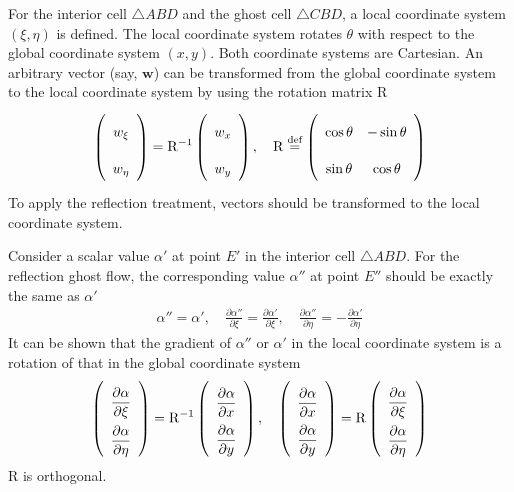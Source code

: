 \documentclass[a4paper,12pt,dvips]{article}
\newcommand*\defeq{\buildrel{\text{def}}\over{=}}
\begin{document}
For the interior cell $\bigtriangleup ABD$ and the ghost cell $\bigtriangleup
CBD$, a local coordinate system $(\xi, \eta)$ is defined.  The local coordinate
system rotates $\theta$ with respect to the global coordinate system $(x, y)$.
Both coordinate systems are Cartesian.  An arbitrary vector (say, $\mathbf{w}$)
can be transformed from the global coordinate system to the local coordinate
system by using the rotation matrix $\mathrm{R}$
\begin{align*}
\left(\begin{array}{c} w_{\xi} \\ w_{\eta} \end{array}\right)
= \mathrm{R}^{-1}
\left(\begin{array}{c} w_x \\ w_y \end{array}\right), \quad
\mathrm{R} \defeq \left(\begin{array}{cc}
  \cos\theta & -\sin\theta \\ \sin\theta & \cos\theta
\end{array}\right)
\end{align*}
To apply the reflection treatment, vectors should be transformed to the local
coordinate system.

Consider a scalar value $\alpha'$ at point $E'$ in the interior cell
$\bigtriangleup ABD$.  For the reflection ghost flow, the corresponding value
$\alpha''$ at point $E''$ should be exactly the same as $\alpha'$
\begin{align}
\alpha'' = \alpha', \quad
\frac{\partial\alpha''}{\partial\xi} = \frac{\partial\alpha'}{\partial\xi},
\quad
\frac{\partial\alpha''}{\partial\eta} = -\frac{\partial\alpha'}{\partial\eta}
\label{e:reflection_sca}
\end{align}
It can be shown that the gradient of $\alpha''$ or $\alpha'$ in the local
coordinate system is a rotation of that in the global coordinate system
\begin{align}
\renewcommand{\arraystretch}{2.2}
\left(\begin{array}{c}
  \dfrac{\partial\alpha}{\partial\xi} \\ 
  \dfrac{\partial\alpha}{\partial\eta}
\end{array}\right) = \mathrm{R}^{-1}
\left(\begin{array}{c}
  \dfrac{\partial\alpha}{\partial x} \\ 
  \dfrac{\partial\alpha}{\partial y}
\end{array}\right), \quad
\renewcommand{\arraystretch}{2.2}
\left(\begin{array}{c}
  \dfrac{\partial\alpha}{\partial x} \\ 
  \dfrac{\partial\alpha}{\partial y}
\end{array}\right) = \mathrm{R}
\left(\begin{array}{c}
  \dfrac{\partial\alpha}{\partial\xi} \\ 
  \dfrac{\partial\alpha}{\partial\eta}
\end{array}\right) \label{e:reflection_sca_trans}
\end{align}
$\mathrm{R}$ is orthogonal.
\end{document}
